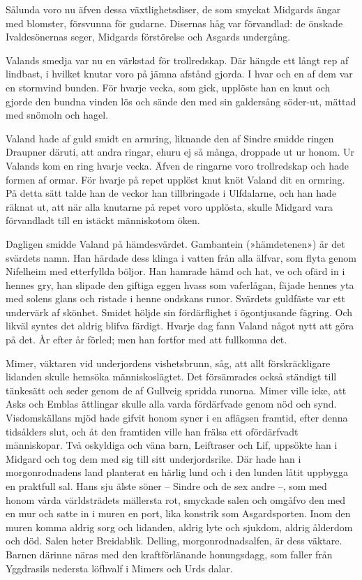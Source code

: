 Sålunda voro nu äfven dessa växtlighetsdiser, de som smyckat Midgards
ängar med blomster, försvunna för gudarne. Disernas håg var förvandlad:
de önskade Ivaldesönernas seger, Midgards förstörelse och Asgards
undergång.

Valands smedja var nu en värkstad för trollredskap. Där hängde ett långt
rep af lindbast, i hvilket knutar voro på jämna afstånd gjorda. I hvar
och en af dem var en stormvind bunden. För hvarje vecka, som gick,
upplöste han en knut och gjorde den bundna vinden lös och sände den med
sin galdersång söder-ut, mättad med snömoln och hagel.

Valand hade af guld smidt en armring, liknande den af Sindre smidde
ringen Draupner däruti, att andra ringar, ehuru
ej så många, droppade ut ur honom. Ur Valands kom en ring hvarje vecka.
Äfven de ringarne voro trollredskap och hade formen af ormar. För hvarje
på repet upplöst knut knöt Valand dit en ormring. På detta sätt talde
han de veckor han tillbringade i Ulfdalarne, och han hade räknat ut, att
när alla knutarne på repet voro upplösta, skulle Midgard vara
förvandladt till en istäckt människotom öken.

Dagligen smidde Valand på hämdesvärdet. Gambantein (»hämdetenen») är det
svärdets namn. Han härdade dess klinga i vatten från alla älfvar, som
flyta genom Nifelheim med etterfyllda böljor. Han hamrade hämd och hat,
ve och ofärd in i hennes gry, han slipade den giftiga eggen hvass som
vaferlågan, fäjade hennes yta med solens glans och ristade i henne
ondskans runor. Svärdets guldfäste var ett undervärk af skönhet. Smidet
höljde sin fördärflighet i ögontjusande fägring. Och likväl syntes det
aldrig blifva färdigt. Hvarje dag fann Valand något nytt att göra på
det. År efter år förled; men han fortfor med att fullkomna det.

Mimer, väktaren vid underjordens vishetsbrunn, såg, att allt
förskräckligare lidanden skulle hemsöka människoslägtet. Det försämrades
också ständigt till tänkesätt och seder genom de af Gullveig spridda
runorna. Mimer ville icke, att Asks och Emblas ättlingar skulle alla
varda fördärfvade genom nöd och synd. Visdomskällans mjöd hade gifvit
honom syner i en aflägsen framtid, efter denna tidsålders slut, och åt
den framtiden ville han frälsa ett ofördärfvadt människopar. Två
oskyldiga och väna barn, Leiftraser och Lif, uppsökte han i Midgard och
tog dem med sig till sitt underjordsrike. Där hade han i morgonrodnadens
land planterat en härlig lund och i den lunden låtit uppbygga en
praktfull sal. Hans sju älste söner -- Sindre och de sex andre --, som
med honom vårda världsträdets mällersta rot, smyckade salen och omgåfvo
den med en mur och satte in i muren en port, lika konstrik som
Asgardsporten. Inom den muren komma aldrig sorg och lidanden, aldrig
lyte och sjukdom, aldrig ålderdom och död. Salen heter Breidablik.
Delling,
morgonrodnadsalfen,
är dess väktare. Barnen därinne näras med den kraftförlänande
honungsdagg, som faller från Yggdrasils nedersta löfhvalf i Mimers och
Urds dalar.

